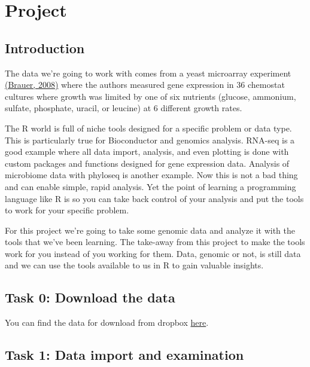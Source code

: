 \documentclass[
]{book}
\begin{document}
\chapter{Project}\label{project}

\section*{Introduction}\label{introduction-1}

The data we're going to work with comes from a yeast microarray experiment \href{http://www.molbiolcell.org/content/19/1/352.abstract}{(Brauer, 2008)} where the authors measured gene expression in 36 chemostat cultures where growth was limited by one of six nutrients (glucose, ammonium, sulfate, phosphate, uracil, or leucine) at 6 different growth rates.

The R world is full of niche tools designed for a specific problem or data type. This is particularly true for Bioconductor and genomics analysis. RNA-seq is a good example where all data import, analysis, and even plotting is done with custom packages and functions designed for gene expression data. Analysis of microbiome data with phyloseq is another example. Now this is not a bad thing and can enable simple, rapid analysis. Yet the point of learning a programming language like R is so you can take back control of your analysis and put the tools to work for your specific problem.

For this project we're going to take some genomic data and analyze it with the tools that we've been learning. The take-away from this project to make the tools work for you instead of you working for them. Data, genomic or not, is still data and we can use the tools available to us in R to gain valuable insights.

\section*{Task 0: Download the data}\label{task-0-download-the-data}

You can find the data for download from dropbox \href{https://www.dropbox.com/sh/jqu2ixdug5el66f/AAB86klTjyR-JgW502KXwbj1a?dl=0}{here}.

\section*{Task 1: Data import and examination}\label{task-1-data-import-and-examination}
\end{document}
